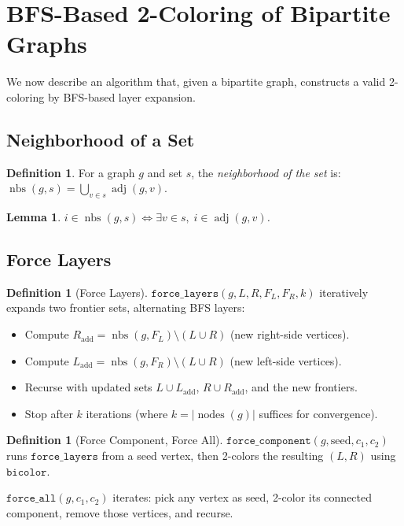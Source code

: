\documentclass[11pt]{article}
\theoremstyle{plain}
\newtheorem{lemma}[theorem]{Lemma}
\theoremstyle{definition}
\newtheorem{definition}[theorem]{Definition}
\theoremstyle{remark}
\newcommand{\adj}{\operatorname{adj}}
\newcommand{\nodes}{\operatorname{nodes}}
\newcommand{\nbs}{\operatorname{nbs}}
\begin{document}
\section{BFS-Based 2-Coloring of Bipartite Graphs}
\label{sec:forcing}

We now describe an algorithm that, given a bipartite graph, constructs a valid 2-coloring by BFS-based layer expansion.

\subsection{Neighborhood of a Set}

\begin{definition}
For a graph $g$ and set $s$, the \emph{neighborhood of the set} is:
$\nbs(g, s) = \bigcup_{v \in s} \adj(g, v)$.
\end{definition}

\begin{lemma}
\label{lem:nbs-spec}
$i \in \nbs(g, s) \iff \exists v \in s,\; i \in \adj(g, v)$.
\end{lemma}

\subsection{Force Layers}

\begin{definition}[Force Layers]
$\texttt{force\_layers}(g, L, R, F_L, F_R, k)$ iteratively expands two frontier sets, alternating BFS layers:
\begin{itemize}[nosep]
  \item Compute $R_{\text{add}} = \nbs(g, F_L) \setminus (L \cup R)$ (new right-side vertices).
  \item Compute $L_{\text{add}} = \nbs(g, F_R) \setminus (L \cup R)$ (new left-side vertices).
  \item Recurse with updated sets $L \cup L_{\text{add}}$, $R \cup R_{\text{add}}$, and the new frontiers.
  \item Stop after $k$ iterations (where $k = |\nodes(g)|$ suffices for convergence).
\end{itemize}
\end{definition}

\begin{definition}[Force Component, Force All]
$\texttt{force\_component}(g, \text{seed}, c_1, c_2)$ runs $\texttt{force\_layers}$ from a seed vertex, then 2-colors the resulting $(L, R)$ using $\texttt{bicolor}$.

$\texttt{force\_all}(g, c_1, c_2)$ iterates: pick any vertex as seed, 2-color its connected component, remove those vertices, and recurse.
\end{definition}
\end{document}
